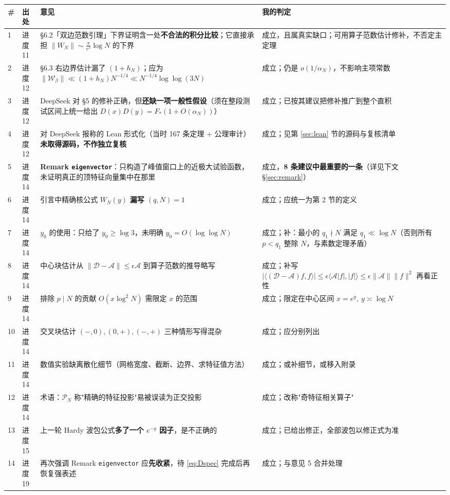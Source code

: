 \documentclass[11pt,a4paper]{ctexart}
\newcommand{\Dk}{\mathcal{D}}
\newcommand{\Ak}{\mathcal{A}}
\newcommand{\al}{\alpha_{N}}
\newcommand{\be}{\beta}
\begin{document}
\begin{longtable}{@{}p{0.55cm}p{2.5cm}p{7.4cm}p{4.6cm}@{}}
\toprule
\# & 出处 & 意见 & 我的判定 \\
\midrule
\endhead
1 & 进度 11 & §6.2「双边范数引理」下界证明含一处\textbf{不合法的积分比较}；它直接承担 $\|W_N\|\sim\frac{\pi}{e^3}\log N$ 的下界 & 成立，且属真实缺口；可用算子范数估计修补，不否定主定理 \\
2 & 进度 12 & §6.3 右边界估计漏了 $(1+h_N)$；应为 $\|\mathcal W_{\be}\|\ll(1+h_N)N^{-1/4}\ll N^{-1/4}\log\log(3N)$ & 成立；仍是 $o(1/\al)$，不影响主项常数 \\
3 & 进度 12 & DeepSeek 对 §5 的修补正确，但\textbf{还缺一项一般性假设}（须在整段测试区间上统一给出 $D(x)D(y)=F_*(1+O(\al))$） & 成立；已按其建议把修补推广到整个直积 \\
4 & 进度 12 & 对 DeepSeek 报称的 Lean 形式化（当时 167 条定理 + 公理审计）\textbf{未取得源码，不作独立复核} & 成立；见第 \ref{sec:lean} 节的源码与复核清单 \\
5 & 进度 14 & \textbf{Remark \texttt{eigenvector}}：只构造了峰值窗口上的近极大试验函数，未证明真正的顶特征向量集中在那里 & 成立，\textbf{8 条建议中最重要的一条}（详见下文 \S\ref{sec:remark}）\\
6 & 进度 14 & 引言中精确核公式 $W_N(y)$ \textbf{漏写 $(q,N)=1$} & 成立；应统一为第 2 节的定义 \\
7 & 进度 14 & $y_0$ 的使用：只给了 $y_0\ge\log3$，未明确 $y_0=O(\log\log N)$ & 成立；补：最小的 $q_1\nmid N$ 满足 $q_1\ll\log N$（否则所有 $p<q_1$ 整除 $N$，与素数定理矛盾）\\
8 & 进度 14 & 中心块估计从 $\|\Dk-\Ak\|\le\epsilon\Ak$ 到算子范数的推导略写 & 成立；补写 $\bigl|\langle(\Dk-\Ak)f,f\rangle\bigr|\le\epsilon\langle\Ak|f|,|f|\rangle\le\epsilon\|\Ak\|\|f\|^2$ 再看正性 \\
9 & 进度 14 & 排除 $p\mid N$ 的贡献 $O(x\log^2N)$ 需限定 $x$ 的范围 & 成立；限定在中心区间 $x=e^y,\ y\asymp\log N$ \\
10 & 进度 14 & 交叉块估计 $(-,0),(0,+),(-,+)$ 三种情形写得混杂 & 成立；应分别列出 \\
11 & 进度 14 & 数值实验缺离散化细节（网格宽度、截断、边界、求特征值方法） & 成立；或补细节，或移入附录 \\
12 & 进度 14 & 术语：$\mathcal P_N$ 称"精确的特征投影"易被误读为正交投影 & 成立；改称"奇特征相关算子" \\
13 & 进度 15 & 上一轮 Hardy 波包公式\textbf{多了一个 $e^{-y}$ 因子}，是不正确的 & 成立；已给出修正，全部波包以修正式为准 \\
14 & 进度 19 & 再次强调 Remark \texttt{eigenvector} 应\textbf{先收紧}，待 \eqref{eq:Dspec} 完成后再恢复强表述 & 成立；与意见 5 合并处理 \\

\end{longtable}
\end{document}
